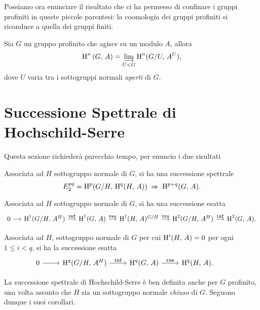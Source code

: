 \begin{profinite}
Possiamo ora enunciare il risultato che ci ha permesso di confinare i gruppi profiniti in queste piccole parentesi: la coomologia dei gruppi profiniti si riconduce a quella dei gruppi finiti.

\begin{proposition}\label{limite}
	Sia $ G $ un gruppo profinito che agisce su un modulo $ A $, allora
	\[ \operatorname{H}^n \left(G, \, A \right)  = \varinjlim_{U < G} \operatorname{H}^n(G/U, \, A^U), \]
	dove $ U $ varia tra i sottogruppi normali \emph{aperti} di $ G $.
\end{proposition}
\end{profinite}


\section{Successione Spettrale di Hochschild-Serre}

Questa sezione richiederà parecchio tempo, per enuncio i due risultati

\begin{theorem}
	Associata ad $ H $ sottogruppo normale di $ G $, si ha una successione spettrale
	\[ E^{pq}_2 = \operatorname{H}^p(G/H, \, \operatorname{H}^q(H, \, A)) \;\Rightarrow\; \operatorname{H}^{p+q}(G, \, A). \]
\end{theorem}

\begin{corollary}\label{boo1}
	Associata ad $ H $ sottogruppo normale di $ G $, si ha una successione esatta
	\[\begin{tikzcd}[column sep = small]
	0 \rar & \HH^1(G/H, \, A^H) \rar["\Inf"]
	& \HH^1(G, \, A) \rar["\Res"]
	& \HH^1(H, \, A)^{G/H} \rar["\mathtt{trs}"]
	& \HH^2(G/H, \, A^H) \rar["\Inf"]
	& \HH^2(G, \, A).
	\end{tikzcd} \]
\end{corollary}

\begin{corollary}\label{boo2}
	Associata ad $ H $, sottogruppo normale di $ G $ per cui $ \operatorname{H}^i(H, \, A ) = 0 $ per ogni $ 1 \leq i < q $, si ha la successione esatta
	\[\begin{tikzcd}
	0 \rar & \HH^q(G/H, \, A^H) \rar["\Inf"]
	& \HH^q(G, \, A) \rar["\Res"]
	& \HH^q(H, \, A).
	\end{tikzcd} \qquad  \]
\end{corollary}

\begin{profinite}
	La successione spettrale di Hochschild-Serre è ben definita anche per $ G $ profinito, una volta assunto che $ H $ sia un sottogruppo normale \emph{chiuso} di $ G $. Seguono dunque i suoi corollari. \todo[ah si? perche?]
\end{profinite}


